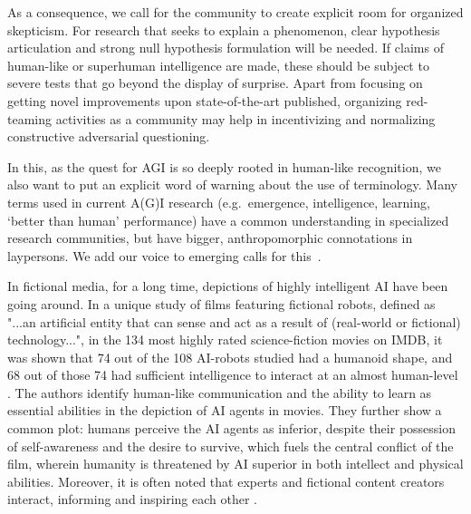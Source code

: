 \documentclass{article}
\theoremstyle{plain}
\theoremstyle{definition}
\theoremstyle{remark}
\begin{document}
As a consequence, we call for the community to create explicit room for organized skepticism. For research that seeks to explain a phenomenon, clear hypothesis articulation and strong null hypothesis formulation will be needed. If claims of human-like or superhuman intelligence are made, these should be subject to severe tests that go beyond the display of surprise. Apart from focusing on getting novel improvements upon state-of-the-art published, organizing red-teaming activities as a community may help in incentivizing and normalizing constructive adversarial questioning.

In this, as the quest for AGI is so deeply rooted in human-like recognition, we also want to put an explicit word of warning about the use of terminology. Many terms used in current A(G)I research (e.g.\ emergence, intelligence, learning, `better than human' performance) have a common understanding in specialized research communities, but have bigger, anthropomorphic connotations in laypersons. We add our voice to emerging calls for this~\cite{shanahan2024talking}.

In fictional media, for a long time, depictions of highly intelligent AI have been going around. In a unique study of films featuring fictional robots, defined as "...an artificial entity that can sense and act as a result of (real-world or fictional) technology...", in the 134 most highly rated science-fiction movies on IMDB, it was shown that 74 out of the 108 AI-robots studied had a humanoid shape, and 68 out of those 74 had sufficient intelligence to interact at an almost human-level \cite{saffari2021does}. The authors identify human-like communication and the ability to learn as essential abilities in the depiction of AI agents in movies. They further show a common plot: humans perceive the AI agents as inferior, despite their possession of self-awareness and the desire to survive, which fuels the central conflict of the film, wherein humanity is threatened by AI superior in both intellect and physical abilities. Moreover, it is often noted that experts and fictional content creators interact, informing and inspiring each other \cite{saffari2021does, neri2020role}.
\end{document}
